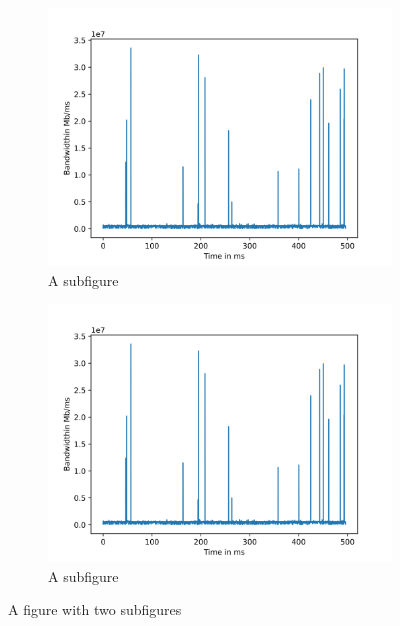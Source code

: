 \documentclass{article}
\begin{document}
\begin{figure}
    \centering
    \begin{subfigure}{.5\textwidth}
      \centering
      \includegraphics[width=1\linewidth]{./Code/nm_mytest_bw.jpg}
      \caption{A subfigure}
      \label{fig:sub1}
    \end{subfigure}%
    \begin{subfigure}{.5\textwidth}
      \centering
      \includegraphics[width=1\linewidth]{./Code/nm_mytest_bw.jpg}
      \caption{A subfigure}
      \label{fig:sub2}
    \end{subfigure}
    \caption{A figure with two subfigures}
    \label{fig:test}
\end{figure}
\end{document}
